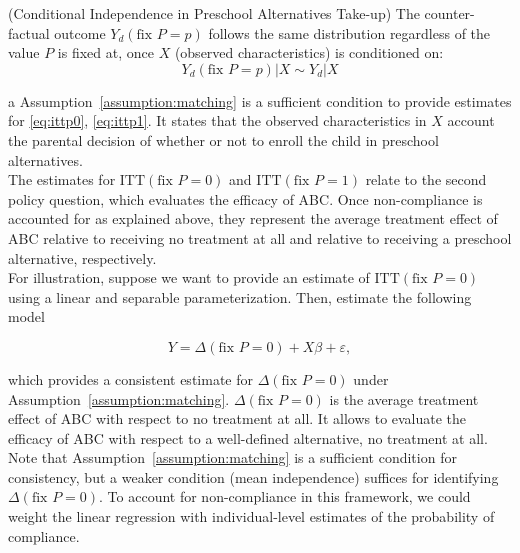 \begin{assumption} \label{assumption:matching} \normalfont (Conditional Independence in Preschool Alternatives Take-up) The counter-factual outcome $Y_{d} \left( \text{fix } P=p \right)$ follows the same distribution regardless of the value $P$ is fixed at, once $X$ (observed characteristics) is conditioned on: 
\begin{equation}
Y_{d} \left( \text{fix } P=p \right) | X \sim Y_{d}  | X 
\end{equation}
 \end{assumption}
a
\noindent Assumption~\ref{assumption:matching} is a sufficient condition to provide estimates for \eqref{eq:ittp0}, \eqref{eq:ittp1}.  It states that the observed characteristics in $X$ account the parental decision of whether or not to enroll the child in preschool alternatives.\\

\noindent The estimates for $\text{ITT} \left( \text{fix } P = 0 \right) $ and $\text{ITT} \left( \text{fix } P = 1 \right)$ relate to the second policy question, which evaluates the efficacy of ABC. Once non-compliance is accounted for as explained above, they represent the average treatment effect of ABC relative to receiving no treatment at all and relative to receiving a preschool alternative, respectively.\\

\noindent For illustration, suppose we want to provide an estimate of $\text{ITT} \left( \text{fix } P = 0 \right)$ using a linear and separable parameterization. Then, estimate the following model 

\begin{equation}
Y = \Delta \left( \text{fix } P = 0 \right) + X \beta + \varepsilon, 
\end{equation}

\noindent which provides a consistent estimate for $\Delta \left( \text{fix } P = 0 \right)$ under Assumption~\ref{assumption:matching}. $\Delta \left( \text{fix } P = 0 \right)$ is the average treatment effect of ABC with respect to no treatment at all. It allows to evaluate the efficacy of ABC with respect to a well-defined alternative, no treatment at all. Note that Assumption~\ref{assumption:matching} is a sufficient condition for consistency, but a weaker condition (mean independence) suffices for identifying $\Delta \left( \text{fix } P = 0 \right)$. To account for non-compliance in this framework, we could weight the linear regression with individual-level estimates of the probability of compliance.\\

